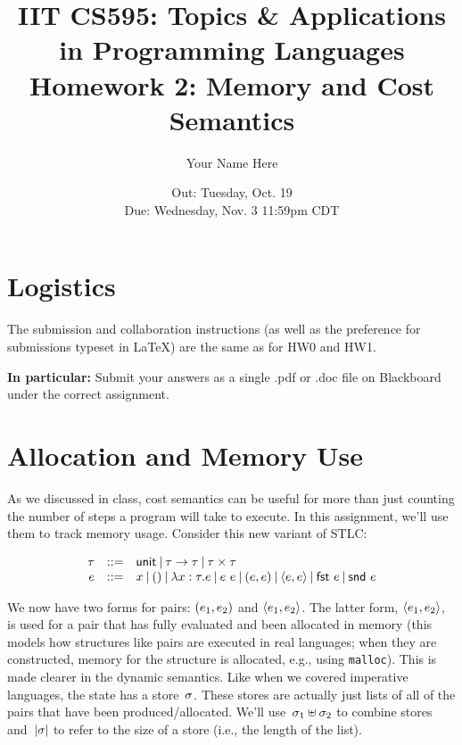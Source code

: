 \documentclass{article}
\title{IIT CS595: Topics \& Applications in Programming Languages\\
  {\large Homework 2: Memory and Cost Semantics}}
\author{Your Name Here}
\date{Out: Tuesday, Oct. 19\\
  Due: Wednesday, Nov. 3 11:59pm CDT\\
}
\begin{document}
\maketitle



\section*{Logistics}
The submission and collaboration instructions (as well as the preference
for submissions typeset in LaTeX) are the same as for HW0 and HW1.

\textbf{In particular:}
Submit your answers as a single .pdf or .doc file  on Blackboard
under
the correct assignment. 

\section{Allocation and Memory Use}

As we discussed in class, cost semantics can be useful for more than just
counting the number of steps a program will take to execute.
%
In this assignment, we'll use them to track memory usage.
%
Consider this new variant of STLC:

\[
\begin{array}{r l l}
  \tau & \mathop{::=} & \mathsf{unit} \mathbin{|}
  \tau \rightarrow \tau \mathbin{|}
  \tau \times \tau\\
  e & \mathop{::=} & x \mathbin{|}
  \mathsf{()} \mathbin{|}
  \lambda x : \tau. e \mathbin{|}
  e~e \mathbin{|}
  (e, e) \mathbin{|}
  \langle e, e \rangle \mathbin{|}
  \mathsf{fst}~e \mathbin{|}
  \mathsf{snd}~e\\
\end{array}
\]

We now have two forms for pairs: $(e_1, e_2)$ and $\langle e_1, e_2 \rangle$.
The latter form, $\langle e_1, e_2 \rangle$, is used for a pair that has fully
evaluated and been allocated in memory (this models how structures like pairs
are executed in real languages; when they are constructed, memory for the
structure is allocated, e.g., using \texttt{malloc}).
%
This is made clearer in the dynamic semantics.
%
Like when we covered imperative languages, the state has a store~$\sigma$.
%
These stores are actually just lists of all of the pairs that have been
produced/allocated.
%
We'll use~$\sigma_1 \uplus \sigma_2$ to combine stores
and~$|\sigma|$ to refer to the size of a store (i.e., the length of the list).
\end{document}

